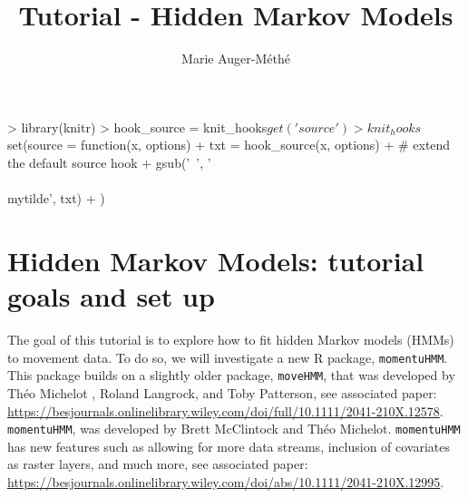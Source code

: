 \documentclass{article}
\newcommand{\mytilde}{\lower.80ex\hbox{\char`\~}\xspace}
\begin{document}


\begin{Schunk}
\begin{Sinput}
> library(knitr)
> hook_source = knit_hooks$get('source')
> knit_hooks$set(source = function(x, options) {
+   txt = hook_source(x, options)
+   # extend the default source hook
+   gsub('~', '\\\\mytilde', txt)
+ })
\end{Sinput}
\end{Schunk}
\begin{Schunk}
\end{Schunk}

\author{Marie Auger-M\'eth\'e}
\title{Tutorial - Hidden Markov Models}
\date{}
\maketitle

\large


\section{Hidden Markov Models: tutorial goals and set up}

The goal of this tutorial is to explore how to fit hidden Markov models (HMMs) to movement data. To do so, we will investigate a new R package, \texttt{momentuHMM}. This package builds on a slightly older package, \texttt{moveHMM}, that was developed by Th\'eo Michelot , Roland Langrock, and Toby Patterson, see associated paper: \url{https://besjournals.onlinelibrary.wiley.com/doi/full/10.1111/2041-210X.12578}. \texttt{momentuHMM}, was developed by Brett McClintock and Th\'eo Michelot. \texttt{momentuHMM} has new features such as allowing for more data streams, inclusion of covariates as raster layers, and much more, see associated paper: \url{https://besjournals.onlinelibrary.wiley.com/doi/abs/10.1111/2041-210X.12995}.
\end{document}
